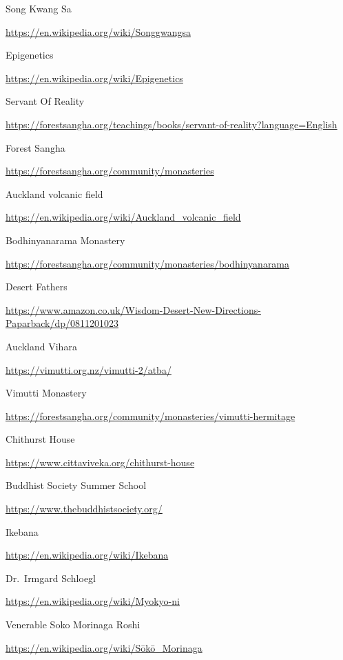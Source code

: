 \begin{thebibliography}{9}
 Song Kwang Sa

  {\urlsize \url{https://en.wikipedia.org/wiki/Songgwangsa}}

 Epigenetics

  {\urlsize \url{https://en.wikipedia.org/wiki/Epigenetics}}

 Servant Of Reality

  {\urlsize \url{https://forestsangha.org/teachings/books/servant-of-reality?language=English}}

 Forest Sangha

  {\urlsize \url{https://forestsangha.org/community/monasteries}}

 Auckland volcanic field

  {\urlsize \url{https://en.wikipedia.org/wiki/Auckland_volcanic_field}}

 Bodhinyanarama Monastery

  {\urlsize \url{https://forestsangha.org/community/monasteries/bodhinyanarama}}

 Desert Fathers

  {\urlsize \url{https://www.amazon.co.uk/Wisdom-Desert-New-Directions-Paparback/dp/0811201023}}

 Auckland Vihara

  {\urlsize \url{https://vimutti.org.nz/vimutti-2/atba/}}

 Vimutti Monastery

  {\urlsize \url{https://forestsangha.org/community/monasteries/vimutti-hermitage}}

 Chithurst House

  {\urlsize \url{https://www.cittaviveka.org/chithurst-house}}

 Buddhist Society Summer School

  {\urlsize \url{https://www.thebuddhistsociety.org/}}

 Ikebana

  {\urlsize \url{https://en.wikipedia.org/wiki/Ikebana}}

 Dr.~Irmgard Schloegl

  {\urlsize \url{https://en.wikipedia.org/wiki/Myokyo-ni}}

 Venerable Soko Morinaga Roshi

  {\urlsize \url{https://en.wikipedia.org/wiki/Sōkō_Morinaga}}


\end{thebibliography}
